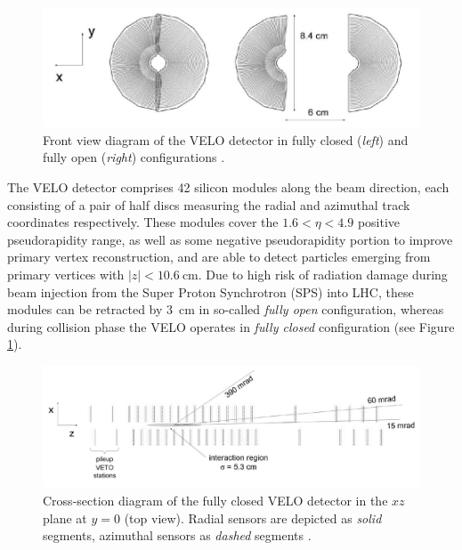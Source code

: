 \begin{figure}[t]
	\centering
	\includegraphics[width=\textwidth]{graphics/02-lhcb/VELO_xy.png}
	\caption[Front view diagram of the VELO detector.]{Front view diagram of the VELO detector in fully closed (\textit{left}) and fully open (\textit{right}) configurations \cite{Barbosa-Marinho:504321}.}
	\label{fig:2:VELO_xy}
\end{figure}

The VELO detector comprises 42 silicon modules along the beam direction, each consisting of a pair of half discs measuring the radial and azimuthal track coordinates respectively. These modules cover the $1.6 < \eta < 4.9$ positive pseudorapidity range, as well as some negative pseudorapidity portion to improve primary vertex reconstruction, and are able to detect particles emerging from primary vertices with $|z| < \SI{10.6}{\centi\meter}$.
Due to high risk of radiation damage during beam injection from the Super Proton Synchrotron (SPS) into LHC, these modules can be retracted by \SI{3}{\centi\meter} in so-called \textit{fully open} configuration, whereas during collision phase the VELO operates in \textit{fully closed} configuration (see Figure \ref{fig:2:VELO_xy}).

\begin{figure}[t]
	\centering
	\includegraphics[width=\textwidth]{graphics/02-lhcb/VELO_xz.png}
	\caption{Cross-section diagram of the fully closed VELO detector in the $xz$ plane at $y=0$ (top view). Radial sensors are depicted as \textit{solid} segments, azimuthal sensors as \textit{dashed} segments \cite{Barbosa-Marinho:504321}.}
	\label{fig:2:VELO_xz}
\end{figure}

